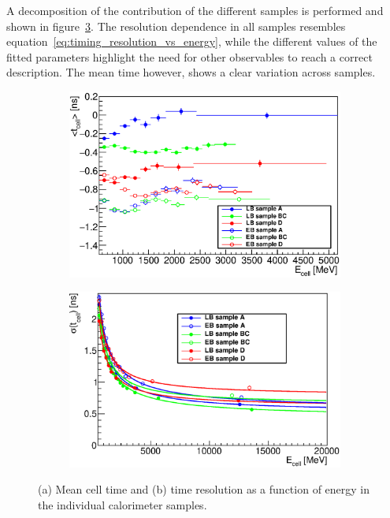 A decomposition of the contribution of the
different samples is performed and shown in figure~\ref{fig:e_split}.
The resolution dependence in all samples
resembles equation~\ref{eq:timing_resolution_vs_energy}, while 
the different values of the fitted parameters highlight the need for other observables to reach a correct
description.
The mean time however, shows a clear variation across
samples.

 
\begin{figure}[tb!]
  \begin{center}
    \begin{subfigure}{0.49\textwidth}
      \includegraphics[width=\textwidth]{TileTimingPerformance/Figures/e_mean_split.eps}
      \caption{}
      \label{fig:mean_vs_energy_split}
    \end{subfigure}
    \begin{subfigure}{0.49\textwidth}
      \includegraphics[width=\textwidth]{TileTimingPerformance/Figures/e_res_split.eps}
    \caption{}
    \label{fig:resolution_vs_energy_split}
    \end{subfigure}
  \end{center}
  \caption{(a) Mean cell time and (b) time resolution as a function of
    energy in the individual calorimeter samples.}
  \label{fig:e_split}
\end{figure}

